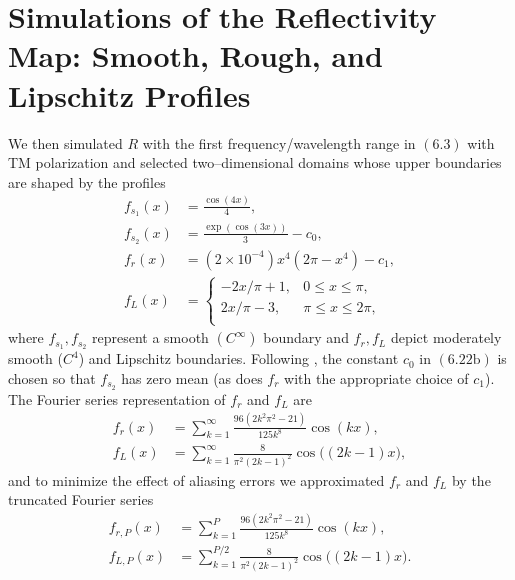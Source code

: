 \section{Simulations of the Reflectivity Map: Smooth, Rough, and Lipschitz Profiles}
\label{Sec: Simulations of the Reflectivity Map: TM Mode with Smooth, Rough, and Lipschitz Profiles}

We then simulated $R$ with the first frequency/wavelength range in $(6.3)$
with TM polarization and selected two--dimensional domains whose upper boundaries are shaped by the profiles
\begin{subequations}
\begin{align}
 f_{s_1}(x) &= \frac{\cos(4x)}{4}, \\
 f_{s_2}(x) &= \frac{\operatorname{exp}\left(\cos(3x)\right)}{3} - c_0,\\   
 f_r(x)&=\left(2\times 10^{-4}\right)x^4\left(2\pi - x^4\right)-c_1,\\
 f_L(x)&= \begin{cases} 
      -2x/\pi + 1, & 0 \leq x\leq \pi, \\
      2x/\pi - 3, & \pi \leq x\leq 2\pi, \\
   \end{cases}
\end{align}
\end{subequations}
where $f_{s_1},f_{s_2}$ represent a smooth $(C^{\infty})$ boundary and $f_r,f_L$ depict moderately smooth ($C^4$) and Lipschitz boundaries. Following \cite{NichollsReitich00a}, the constant $c_0$ in $(6.22\text{b})$ is chosen so that $f_{s_2}$ has zero mean (as does $f_r$ with the appropriate choice of $c_1$). The Fourier series representation of $f_r$ and $f_L$ are
\begin{subequations}
\begin{align}
f_r(x) &= \sum_{k=1}^{\infty}\frac{96\left(2k^2\pi^2 - 21\right)}{125k^8}\cos(kx),\\
f_L(x) &= \sum_{k=1}^{\infty}\frac {8}{\pi^2(2k-1)^2}\cos\big((2k-1)x\big),
\end{align}
\end{subequations}
and to minimize the effect of aliasing errors we approximated $f_r$ and $f_L$ by the truncated Fourier series
\begin{subequations}
\begin{align}
f_{r,P}(x) &= \sum_{k=1}^{P}\frac{96\left(2k^2\pi^2 - 21\right)}{125k^8}\cos(kx),\\
f_{L,P}(x) &= \sum_{k=1}^{P/2}\frac {8}{\pi^2(2k-1)^2}\cos\big((2k-1)x\big).
\end{align}
\end{subequations}
